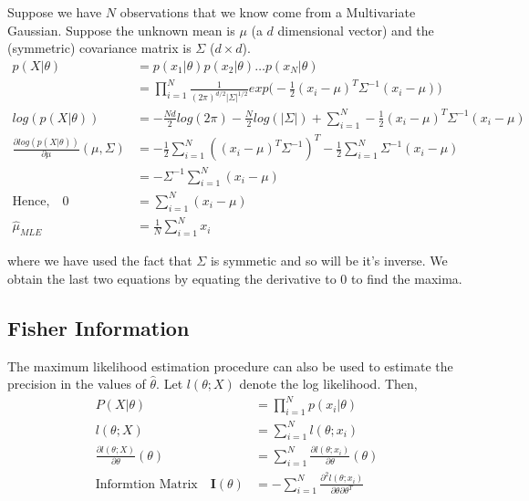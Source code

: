 \documentclass[../statistical_learning_notes.tex]{subfiles}
\begin{document}
Suppose we have $N$ observations that we know come from a Multivariate Gaussian. Suppose the unknown mean is $\mu$ (a $d$ dimensional vector) and the (symmetric) covariance matrix is $\Sigma$ ($d \times d$).
\begin{align*}
    p(X|\theta) &= p(x_{1}|\theta)p(x_{2}|\theta) \ldots p(x_{N}|\theta)\\
    &= \prod_{i=1}^{N}\frac{1}{(2\pi)^{d/2} \lvert \Sigma \rvert^{1/2}} exp \bigg(-\frac{1}{2}(x_{i} - \mu)^{T}\Sigma^{-1}(x_{i} - \mu) \bigg)\\
    log(p(X|\theta)) &= -\frac{Nd}{2}log(2\pi) - \frac{N}{2}log(\lvert \Sigma \rvert) + \sum_{i=1}^{N}-\frac{1}{2}(x_{i} - \mu)^{T}\Sigma^{-1}(x_{i} - \mu)\\
    \frac{\partial log(p(X|\theta))}{\partial \mu}(\mu, \Sigma) &= -\frac{1}{2}\sum_{i=1}^{N} ((x_{i} - \mu)^{T}\Sigma^{-1})^{T} - \frac{1}{2}\sum_{i=1}^{N} \Sigma^{-1}(x_{i} - \mu)\\
    &= -\Sigma^{-1}\sum_{i=1}^{N} (x_{i} - \mu)\\
    \text{Hence,} \quad 0 &= \sum_{i=1}^{N} (x_{i} - \mu)\\
    \hat{\mu}_{MLE} &= \frac{1}{N}\sum_{i=1}^{N} x_{i}
\end{align*}

where we have used the fact that $\Sigma$ is symmetic and so will be it's inverse. We obtain the last two equations by equating the derivative to $0$ to find the maxima.


\subsection{Fisher Information}
The maximum likelihood estimation procedure can also be used to estimate the precision in the values of $\hat{\theta}$. Let $l(\theta;X)$ denote the log likelihood. Then,
\begin{align*}
    P(X|\theta) &= \prod_{i=1}^{N} p(x_{i}|\theta)\\
    l(\theta;X) &= \sum_{i=1}^{N} l(\theta;x_{i})\\
    \frac{\partial l(\theta;X)}{\partial \theta}(\theta) &= \sum_{i=1}^{N} \frac{\partial l(\theta;x_{i})}{\partial \theta}(\theta)\\
    \text{Informtion Matrix} \quad \mathbf{I}(\theta) &= -\sum_{i=1}^{N} \frac{\partial^{2}l(\theta;x_{i})}{\partial \theta \partial \theta^{T}}
\end{align*}
\end{document}

